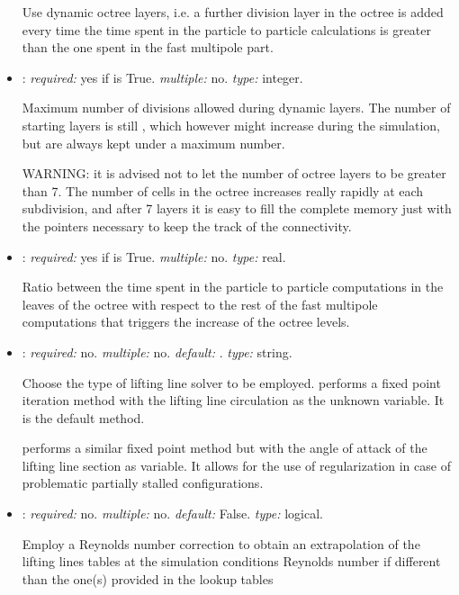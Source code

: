 \begin{itemize}
Use dynamic octree layers, i.e. a further division layer in the octree is added every time the time spent in the particle to particle calculations is greater than the one spent in the fast multipole part.

\item {}: \textit{required:} yes if  is True. \textit{multiple:} no. \textit{type:} integer.

Maximum number of divisions allowed during dynamic layers. The number of starting layers is still , which however might increase during the simulation, but are always kept under a maximum number. 

WARNING: it is advised not to let the number of octree layers to be greater than 7. The number of cells in the octree increases really rapidly at each subdivision, and after 7 layers it is easy to fill the complete memory just with the pointers necessary to keep the track of the connectivity. 

\item {}: \textit{required:} yes if  is True. \textit{multiple:} no. \textit{type:} real.

Ratio between the time spent in the particle to particle computations in the leaves of the octree with respect to the rest of the fast multipole computations that triggers the increase of the octree levels.

\item {}: \textit{required:} no. \textit{multiple:} no. \textit{default:} . \textit{type:} string.

Choose the type of lifting line solver to be employed. 
 performs a fixed point iteration method with the lifting line circulation as the unknown variable. It is the default method. 

 performs a similar fixed point method but with the angle of attack of the lifting line section as variable. It allows for the use of regularization in case of problematic partially stalled configurations. 

\item {}: \textit{required:} no. \textit{multiple:} no. \textit{default:} False. \textit{type:} logical.

Employ a Reynolds number correction to obtain an extrapolation of the lifting lines tables at the simulation conditions Reynolds number if different than the one(s) provided in the lookup tables


\end{itemize}
